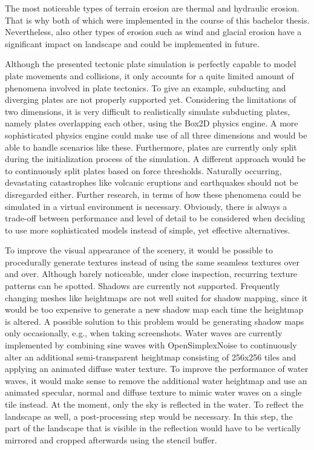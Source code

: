 \documentclass[11pt,a4paper,twoside,openright]{report}
\begin{document}
The most noticeable types of terrain erosion are thermal and hydraulic erosion. That is why both of which were implemented in the course of this bachelor thesis. Nevertheless, also other types of erosion such as wind and glacial erosion have a significant impact on landscape and could be implemented in future.

Although the presented tectonic plate simulation is perfectly capable to model plate movements and collisions, it only accounts for a quite limited amount of phenomena involved in plate tectonics. To give an example, subducting and diverging plates are not properly supported yet. Considering the limitations of two dimensions, it is very difficult to realistically simulate subducting plates, namely plates overlapping each other, using the Box2D physics engine. A more sophisticated physics engine could make use of all three dimensions and would be able to handle scenarios like these. Furthermore, plates are currently only split during the initialization process of the simulation. A different approach would be to continuously split plates based on force thresholds. Naturally occurring, devastating catastrophes like volcanic eruptions and earthquakes should not be disregarded either. Further research, in terms of how these phenomena could be simulated in a virtual environment is necessary. Obviously, there is always a trade-off between performance and level of detail to be considered when deciding to use more sophisticated models instead of simple, yet effective alternatives.

To improve the visual appearance of the scenery, it would be possible to procedurally generate textures instead of using the same seamless textures over and over. Although barely noticeable, under close inspection, recurring texture patterns can be spotted.
Shadows are currently not supported. Frequently changing meshes like heightmaps are not well suited for shadow mapping, since it would be too expensive to generate a new shadow map each time the heightmap is altered. A possible solution to this problem would be generating shadow maps only occasionally, e.g., when taking screenshots.
Water waves are currently implemented by combining sine waves with OpenSimplexNoise to continuously alter an additional semi-transparent heightmap consisting of 256x256 tiles and applying an animated diffuse water texture. To improve the performance of water waves, it would make sense to remove the additional water heightmap and use an animated specular, normal and diffuse texture to mimic water waves on a single tile instead.
At the moment, only the sky is reflected in the water. To reflect the landscape as well, a post-processing step would be necessary. In this step, the part of the landscape that is visible in the reflection would have to be vertically mirrored and cropped afterwards using the stencil buffer.




\end{document}
